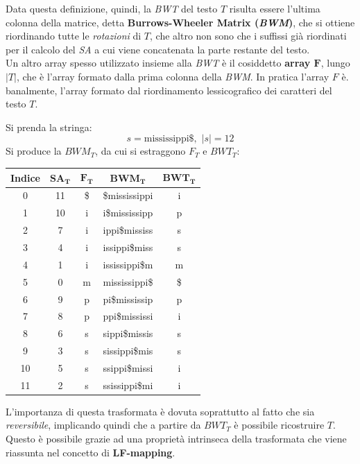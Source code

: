 Data questa definizione, quindi, la \textit{BWT} del testo $T$ risulta essere
l'ultima colonna della matrice, detta \textbf{Burrows-Wheeler Matrix
  (\textit{BWM})}, che si ottiene riordinando tutte le 
\textit{rotazioni} di $T$, che altro non sono che i suffissi già riordinati per
il calcolo del \textit{SA} a cui viene concatenata la parte restante del
testo.\\
Un altro array spesso utilizzato insieme alla \textit{BWT} è il cosiddetto
\textbf{array $\mathbf{F}$}, lungo $|T|$, che è l'array formato
dalla prima colonna della \textit{BWM}. In pratica l'array $F$ è.
banalmente, l'array formato dal riordinamento 
lessicografico dei caratteri del testo $T$.
\begin{esempio}
  Si prenda la stringa:
  \[s=\mbox{mississippi\$},\,\,|s|=12\]
  Si produce la $BWM_T$, da cui si estraggono $F_T$ e $BWT_T$:
  \begin{table}[H]
    \centering
    \footnotesize
    \begin{tabular}{c|c|c|c|c} 
      \textbf{Indice} & $\mathbf{SA_T}$ & $\mathbf{F_T}$ & $\mathbf{BWM_T}$
      & $\mathbf{BWT_T}$\\ 
      \hline
      0 & 11 & \$ & \$mississippi & i\\
      1 & 10 & i & i\$mississipp & p\\
      2 & 7 & i & ippi\$mississ & s\\
      3 & 4 & i & issippi\$miss & s\\
      4 & 1 & i & ississippi\$m & m\\
      5 & 0 & m & mississippi\$ & \$\\
      6 & 9 & p & pi\$mississip & p\\
      7 & 8 & p & ppi\$mississi & i\\
      8 & 6 & s & sippi\$missis & s\\
      9 & 3 & s & sissippi\$mis & s\\
      10 & 5 & s & ssippi\$missi & i\\
      11 & 2 & s & ssissippi\$mi & i\\
    \end{tabular}
  \end{table}
\end{esempio}
L'importanza di questa trasformata è dovuta soprattutto al fatto che sia
\textit{reversibile}, implicando quindi che a partire da $BWT_T$ è possibile
ricostruire $T$. Questo è possibile grazie ad una proprietà intrinseca della
trasformata che viene riassunta nel concetto di \textbf{LF-mapping}.
